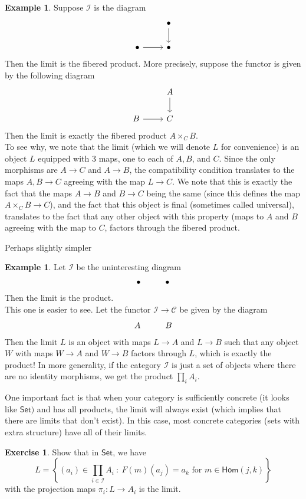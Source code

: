 \documentclass[psamsfonts]{amsart}
\theoremstyle{definition}
\newtheorem{exmp}[thm]{Example}
\newtheorem{exer}[thm]{Exercise}
\theoremstyle{remark}
\renewcommand{\hom}{\mathsf{Hom}}
\newcommand{\set}[1]{\left\lbrace #1 \right\rbrace}
\begin{document}
\begin{exmp}
Suppose $\mathscr{I}$ is the diagram 
$$\begin{tikzcd}
& \bullet \arrow[d] \\
\bullet \arrow[r] & \bullet
\end{tikzcd}$$
Then the limit is the fibered product. More precisely, suppose the functor is given by the following diagram
$$\begin{tikzcd}
& A \arrow[d]\\
B \arrow[r] & C
\end{tikzcd}$$
Then the limit is exactly the fibered product $A \times_C B$. \\

To see why, we note that the limit (which we will denote $L$ for convenience) is an object $L$ equipped with $3$ maps, one to each of $A,B$, and $C$. Since the only morphisms are $A \to C$ and $A \to B$, the compatibility condition translates to the maps $A,B \to C$ agreeing with the map $L \to C$. We note that this is exactly the fact that the maps $A \to B$ and $B \to C$ being the same (since this defines the map $A \times_C B \to C$), and the fact that this object is final (sometimes called universal), translates to the fact that any other object with this property (maps to $A$ and $B$ agreeing with the map to $C$, factors through the fibered product.
\end{exmp}
Perhaps slightly simpler
\begin{exmp}
Let $\mathscr{I}$ be the uninteresting diagram 
$$\xymatrix{
\bullet & \bullet
}$$
Then the limit is the product. \\

This one is easier to see. Let the functor $\mathscr{I} \to \mathscr{C}$ be given by the diagram
$$\xymatrix{
A & B
} $$
Then the limit $L$ is an object with maps $L \to A$ and $L \to B$ such that any object $W$ with maps $W \to A$ and $W \to B$ factors through $L$, which is exactly the product! In more generality, if the category $\mathscr{I}$ is just a set of objects where there are no identity morphisms, we get the product $\prod_i A_i$. \\
\end{exmp}
%
One important fact is that when your category is sufficiently concrete (it looks like $\mathsf{Set})$ and has all products, the limit will always exist (which implies that there are limits that don't exist). In this case, most concrete categories (sets with extra structure) have all of their limits.
%
\begin{exer}
Show that in $\mathsf{Set}$, we have 
$$L = \set{(a_i) \in \prod_{i \in \mathscr{I}} A_i ~\colon~ F(m)(a_j) = a_k \text{ for } m \in \hom(j,k)}$$
with the projection maps $\pi_i: L \to A_i$ is the limit.
\end{exer}
\end{document}
